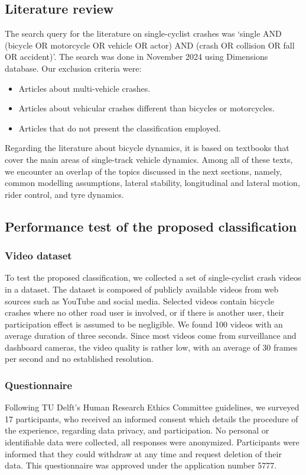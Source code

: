 \documentclass{article}
\begin{document}
\subsection{Literature review}
%
The search query for the literature on single-cyclist crashes was `single AND (bicycle OR motorcycle OR vehicle OR actor) AND (crash OR collision OR fall OR accident)'.
%
The search was done in November 2024 using Dimensions database.
%
Our exclusion criteria were:
%
\begin{itemize}
    \item Articles about multi-vehicle crashes.
    \item Articles about vehicular crashes different than bicycles or motorcycles.
    \item Articles that do not present the classification employed.
\end{itemize}
%
Regarding the literature about bicycle dynamics, it is based on textbooks that cover the main areas of single-track vehicle dynamics.
%
Among all of these texts, we encounter an overlap of the topics discussed in the next sections, namely, common modelling assumptions, lateral stability, longitudinal and lateral motion, rider control, and tyre dynamics.


\subsection{Performance test of the proposed classification}
%
\subsubsection{Video dataset}
%
To test the proposed classification, we collected a set of single-cyclist crash videos in a dataset.
%
The dataset is composed of publicly available videos from web sources such as YouTube and social media.
%
Selected videos contain bicycle crashes where no other road user is involved, or if there is another user, their participation effect is assumed to be negligible.
%
We found 100 videos with an average duration of three seconds.
%
Since most videos come from surveillance and dashboard cameras, the video quality is rather low, with an average of 30 frames per second and no established resolution.


\subsubsection{Questionnaire}
%
Following TU Delft's Human Research Ethics Committee guidelines, we surveyed 17 participants, who received an informed consent which details the procedure of the experience, regarding data privacy, and participation.
%
No personal or identifiable data were collected, all responses were anonymized.
%
Participants were informed that they could withdraw at any time and request deletion of their data.
%
This questionnaire was approved under the application number 5777.
\end{document}
